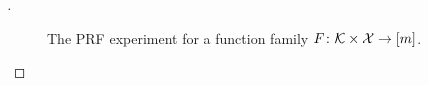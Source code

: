 \begin{proof}[]
%
%

\begin{figure}
\centering
{}
\caption{The PRF experiment for a function family $F \colon {\cal K}
  \times {\cal X} \to [m]$. }\label{fig:prf}
\end{figure}


\end{proof}
